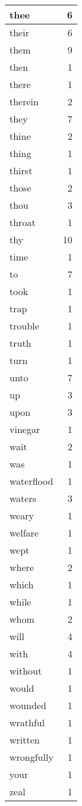 \begin{center}
\begin{longtable}{l|r}
thee & 6\\ \hline 
their & 6\\ \hline 
them & 9\\ \hline 
then & 1\\ \hline 
there & 1\\ \hline 
therein & 2\\ \hline 
they & 7\\ \hline 
thine & 2\\ \hline 
thing & 1\\ \hline 
thirst & 1\\ \hline 
those & 2\\ \hline 
thou & 3\\ \hline 
throat & 1\\ \hline 
thy & 10\\ \hline 
time & 1\\ \hline 
to & 7\\ \hline 
took & 1\\ \hline 
trap & 1\\ \hline 
trouble & 1\\ \hline 
truth & 1\\ \hline 
turn & 1\\ \hline 
unto & 7\\ \hline 
up & 3\\ \hline 
upon & 3\\ \hline 
vinegar & 1\\ \hline 
wait & 2\\ \hline 
was & 1\\ \hline 
waterflood & 1\\ \hline 
waters & 3\\ \hline 
weary & 1\\ \hline 
welfare & 1\\ \hline 
wept & 1\\ \hline 
where & 2\\ \hline 
which & 1\\ \hline 
while & 1\\ \hline 
whom & 2\\ \hline 
will & 4\\ \hline 
with & 4\\ \hline 
without & 1\\ \hline 
would & 1\\ \hline 
wounded & 1\\ \hline 
wrathful & 1\\ \hline 
written & 1\\ \hline 
wrongfully & 1\\ \hline 
your & 1\\ \hline 
zeal & 1\\ \hline 
\end{longtable}
\end{center}



